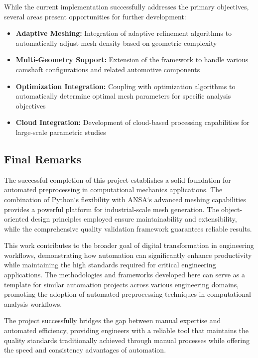 \documentclass{book}
\begin{document}
\begin{itemize}[leftmargin=*,label=\textbullet]
\begin{itemize}
While the current implementation successfully addresses the primary objectives, several areas present opportunities for further development:

\begin{itemize}
    \item \textbf{Adaptive Meshing:} Integration of adaptive refinement algorithms to automatically adjust mesh density based on geometric complexity
    \item \textbf{Multi-Geometry Support:} Extension of the framework to handle various camshaft configurations and related automotive components
    \item \textbf{Optimization Integration:} Coupling with optimization algorithms to automatically determine optimal mesh parameters for specific analysis objectives
    \item \textbf{Cloud Integration:} Development of cloud-based processing capabilities for large-scale parametric studies
\end{itemize}

\subsection{Final Remarks}

The successful completion of this project establishes a solid foundation for automated preprocessing in computational mechanics applications. The combination of Python`s flexibility with ANSA`s advanced meshing capabilities provides a powerful platform for industrial-scale mesh generation. The object-oriented design principles employed ensure maintainability and extensibility, while the comprehensive quality validation framework guarantees reliable results.

This work contributes to the broader goal of digital transformation in engineering workflows, demonstrating how automation can significantly enhance productivity while maintaining the high standards required for critical engineering applications. The methodologies and frameworks developed here can serve as a template for similar automation projects across various engineering domains, promoting the adoption of automated preprocessing techniques in computational analysis workflows.

The project successfully bridges the gap between manual expertise and automated efficiency, providing engineers with a reliable tool that maintains the quality standards traditionally achieved through manual processes while offering the speed and consistency advantages of automation.


\end{itemize}
\end{itemize}
\end{document}
